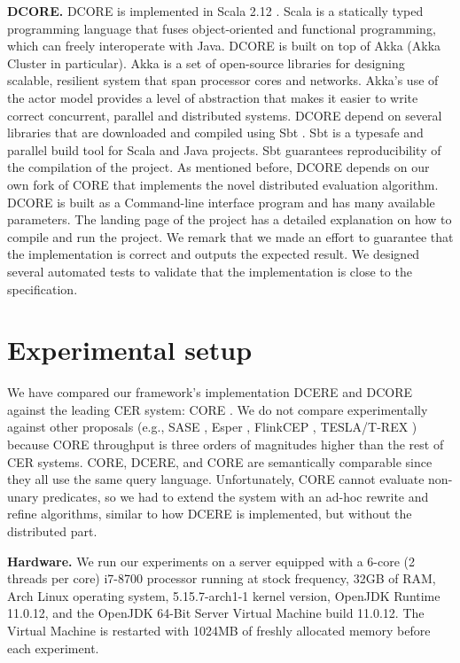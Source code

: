 \textbf{DCORE.} DCORE is implemented in Scala 2.12 \cite{scala}. Scala \cite{scala} is a statically typed programming language that fuses object-oriented and functional programming, which can freely interoperate with Java. DCORE is built on top of Akka \cite{akka} (Akka Cluster in particular). Akka is a set of open-source libraries for designing scalable, resilient system that span processor cores and networks. Akka’s use of the actor model provides a level of abstraction that makes it easier to write correct concurrent, parallel and distributed systems. DCORE depend on several libraries that are downloaded and compiled using Sbt \cite{sbt}. Sbt is a typesafe and parallel build tool for Scala and Java projects. Sbt guarantees reproducibility of the compilation of the project. As mentioned before, DCORE depends on our own fork of CORE that implements the novel distributed evaluation algorithm. DCORE is built as a Command-line interface program and has many available parameters. The landing page of the project has a detailed explanation on how to compile and run the project. We remark that we made an effort to guarantee that the implementation is correct and outputs the expected result. We designed several automated tests to validate that the implementation is close to the specification.

\section{Experimental setup}\label{sec:setup}


We have compared our framework's implementation DCERE and DCORE against the leading CER system: CORE \cite{core}.
We do not compare experimentally against other proposals (e.g., SASE \cite{sase}, Esper \cite{esper}, FlinkCEP \cite{flink-cep}, TESLA/T-REX \cite{tesla}) because CORE throughput is three orders of magnitudes higher than the rest of CER systems. CORE, DCERE, and CORE are semantically comparable since they all use the same query language. Unfortunately, CORE cannot evaluate non-unary predicates, so we had to extend the system with an ad-hoc rewrite and refine algorithms, similar to how DCERE is implemented, but without the distributed part.

\textbf{Hardware.} We run our experiments on a server equipped with a 6-core (2 threads per core) i7-8700 processor running at stock frequency, 32GB of RAM, Arch Linux operating system, 5.15.7-arch1-1 kernel version, OpenJDK Runtime 11.0.12, and the OpenJDK 64-Bit Server Virtual Machine build 11.0.12. The Virtual Machine is restarted with 1024MB of freshly allocated memory before each experiment.

